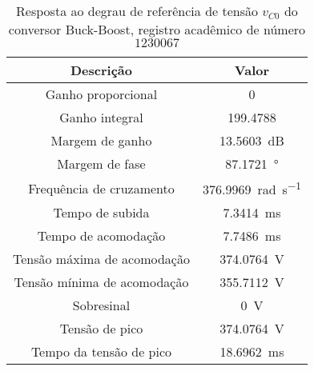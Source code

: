 \begin{table}[!ht]
\centering
\caption{Resposta ao degrau de referência de tensão $v_{C0}$ do conversor Buck-Boost, registro acadêmico de número $1230067$}
\label{tab:resposta1malha}
\begin{tabular}{@{}cc@{}}
\toprule
\textbf{Descrição} & \textbf{Valor}\\ \midrule
Ganho proporcional & \SI{0}{}\\
Ganho integral & \SI{199.4788}{}\\
Margem de ganho & \SI{13.5603}{\deci\bel}\\
Margem de fase & \SI{87.1721}{\degree}\\
Frequência de cruzamento & \SI{376.9969}{\radian\per\s}\\
Tempo de subida & \SI{7.3414}{\milli\s}\\
Tempo de acomodação & \SI{7.7486}{\milli\s}\\
Tensão máxima de acomodação & \SI{374.0764}{\V}\\
Tensão mínima de acomodação & \SI{355.7112}{\V}\\
Sobresinal & \SI{0}{\V}\\
Tensão de pico & \SI{374.0764}{\V}\\
Tempo da tensão de pico & \SI{18.6962}{\milli\s}\\
\bottomrule
\end{tabular}
\end{table}

